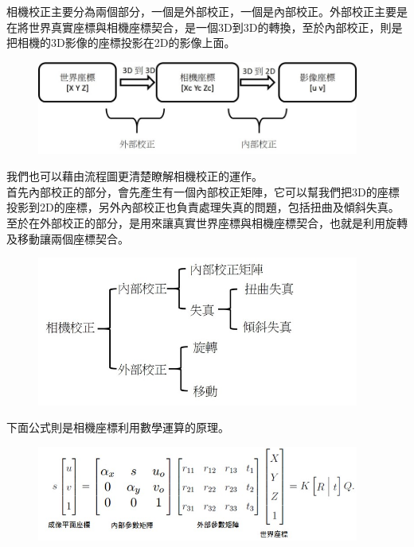 \documentclass{article}
\begin{document}
相機校正主要分為兩個部分，一個是外部校正，一個是內部校正。外部校正主要是在將世界真實座標與相機座標契合，是一個3D到3D的轉換，至於內部校正，則是把相機的3D影像的座標投影在2D的影像上面。
\\
\begin{figure}[htp]
    \begin{center}
        \includegraphics[width=300pt]{pic/圖片3.jpg}
    \end{center}
\end{figure}

我們也可以藉由流程圖更清楚瞭解相機校正的運作。
\\首先內部校正的部分，會先產生有一個內部校正矩陣，它可以幫我們把3D的座標投影到2D的座標，另外內部校正也負責處理失真的問題，包括扭曲及傾斜失真。
\\至於在外部校正的部分，是用來讓真實世界座標與相機座標契合，也就是利用旋轉及移動讓兩個座標契合。
\\
\begin{figure}[htp]
    \begin{center}
        \includegraphics[width=300pt]{pic/圖片4.jpg}
    \end{center}
\end{figure}

下面公式則是相機座標利用數學運算的原理。
\\
\begin{figure}[htp]
    \begin{center}
        \includegraphics[width=300pt]{pic/圖片5.jpg}
    \end{center}
\end{figure}
\end{document}
